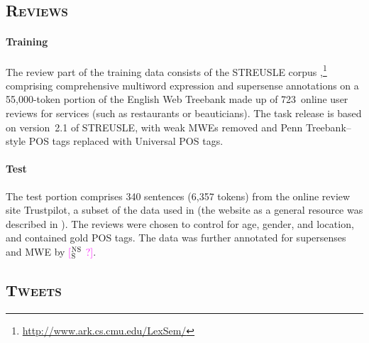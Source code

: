 \documentclass[11pt,letterpaper]{article}
\newcommand{\ensuretext}[1]{#1}
\newcommand{\nssmarker}{\ensuretext{\textcolor{magenta}{\ensuremath{^{\textsc{NS}}_{\textsc{S}}}}}}
\newcommand{\arkcomment}[3]{\ensuretext{\textcolor{#3}{[#1 #2]}}}
\newcommand{\nss}[1]{\arkcomment{\nssmarker}{#1}{magenta}}
\begin{document}
\subsection{\textsc{Reviews}} 
\paragraph{Training}
The review part of the training data consists of the STREUSLE corpus \citet{schneider-14-corpus,schneider-15},\footnote{\url{http://www.ark.cs.cmu.edu/LexSem/}}
comprising comprehensive multiword expression and supersense annotations on a 55,000-token portion of the English Web Treebank \citep[EWTB;][]{ewtb} 
made up of 723~online user reviews for services (such as restaurants or beauticians).
The task release is based on version~2.1 of STREUSLE, with weak MWEs removed
and Penn Treebank--style POS tags replaced with Universal POS tags. 

\paragraph{Test}
The test portion comprises 340 sentences (6,357 tokens) from the online review site Trustpilot, a subset of the data used in \citet{hovy-2015age} 
(the website as a general resource was described in \citet{hovy-2015trustpilot}). 
The reviews were chosen to control for age, gender, and location, and contained gold POS tags. 
The data was further annotated for supersenses and MWE by \nss{?}.

\subsection{\textsc{Tweets}} 
\end{document}
